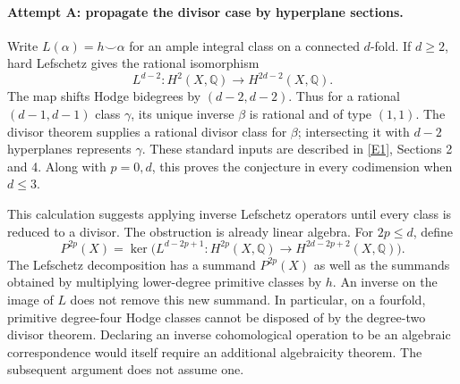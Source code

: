 \documentclass[11pt]{article}
\begin{document}
\paragraph{Attempt A: propagate the divisor case by hyperplane sections.}
Write $L(\alpha)=h\smile\alpha$ for an ample integral class on a connected
$d$-fold. If $d\ge2$, hard Lefschetz gives the rational isomorphism
\[
 L^{d-2}:H^2(X,\mathbb Q)\longrightarrow H^{2d-2}(X,\mathbb Q).
\]
The map shifts Hodge bidegrees by $(d-2,d-2)$. Thus for a rational
$(d-1,d-1)$ class $\gamma$, its unique inverse $\beta$ is rational and of
type $(1,1)$. The divisor theorem supplies a rational divisor class for
$\beta$; intersecting it with $d-2$ hyperplanes represents $\gamma$.
These standard inputs are described in \href{https://www.claymath.org/wp-content/uploads/2022/06/hodge.pdf}{[E1]}, Sections 2 and 4. Along with
$p=0,d$, this proves the conjecture in every codimension when $d\le3$.

This calculation suggests applying inverse Lefschetz operators until every
class is reduced to a divisor. The obstruction is already linear algebra.
For $2p\le d$, define
\[
 P^{2p}(X)=\ker\bigl(L^{d-2p+1}:H^{2p}(X,\mathbb Q)
                       \longrightarrow H^{2d-2p+2}(X,\mathbb Q)\bigr).
\]
The Lefschetz decomposition has a summand $P^{2p}(X)$ as well as the
summands obtained by multiplying lower-degree primitive classes by $h$.
An inverse on the image of $L$ does not remove this new summand. In
particular, on a fourfold, primitive degree-four Hodge classes cannot be
disposed of by the degree-two divisor theorem. Declaring an inverse
cohomological operation to be an algebraic correspondence would itself
require an additional algebraicity theorem. The subsequent argument does
not assume one.
\end{document}
